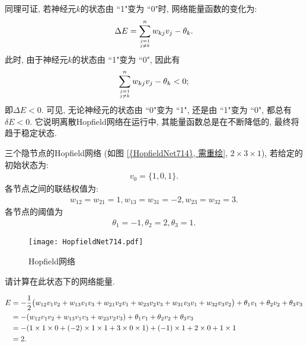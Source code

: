 同理可证, 若神经元$k$的状态由 ``1"变为 ``0"时, 网络能量函数的变化为:
\begin{align}
    \Delta E=\sum_{j=1 \atop j \neq k}^{n} w_{k j} v_{j}-\theta_{k}.
\end{align}
此时, 由于神经元$k$的状态由 ``1"变为 ``0", 因此有
\begin{align}
    \sum_{j=1 \atop j \neq k}^{n} w_{k j} v_{j}-\theta_{k}<0;
\end{align}
即$\Delta E<0$.
可见, 无论神经元的状态由 ``0"变为 ``1", 还是由 ``1"变为 ``0", 都总有$\delta E<0$.
它说明离散Hopfield网络在运行中, 其能量函数总是在不断降低的, 最终将趋于稳定状态.
\begin{example}
    三个隐节点的Hopfield网络 (如图 \ref{{HopfieldNet714}, 需重绘}, $2\times 3\times 1$), 若给定的初始状态为:
\begin{align*}
    v_0=\{1,0,1\}.
\end{align*}
各节点之间的联结权值为:
\begin{align*}
     w_{12}=w_{21}=1, w_{13}=w_{31}=-2, w_{23}=w_{32}=3.
\end{align*}
各节点的阈值为
\begin{align*}
    \theta_1=-1, \theta_2=2, \theta_3=1.
\end{align*}
\begin{figure}[H]
    \centering
    \texttt{[image: HopfieldNet714.pdf]}
    \caption{Hopfield网络}
    \label{HopfieldNet714}
\end{figure}

请计算在此状态下的网络能量.
\end{example}
\begin{result}
\begin{align}
E   &=-\frac 1 2 \big (w_{12}v_1v_2+w_{13}v_1v_3+w_{21}v_2 v_1+w_{23}v_2v_3+w_{31}v_3v_1+w_{32}v_3 v_2\big)+ \theta_1 v_1+ \theta_2v_2+ \theta_3v_3\notag\\
    &= - (w_{12}v_1v_2+w_{13}v_1v_3+w_{23}v_2v_3)+ \theta_1v_1+\theta_2v_2+\theta_3v_3\notag\\
    &=- (1\times 1\times 0+ (-2)\times 1\times 1+3\times 0\times 1)+ (-1) \times 1+2\times 0+1\times 1\notag\\
    &=2.
\end{align}
\end{result}

